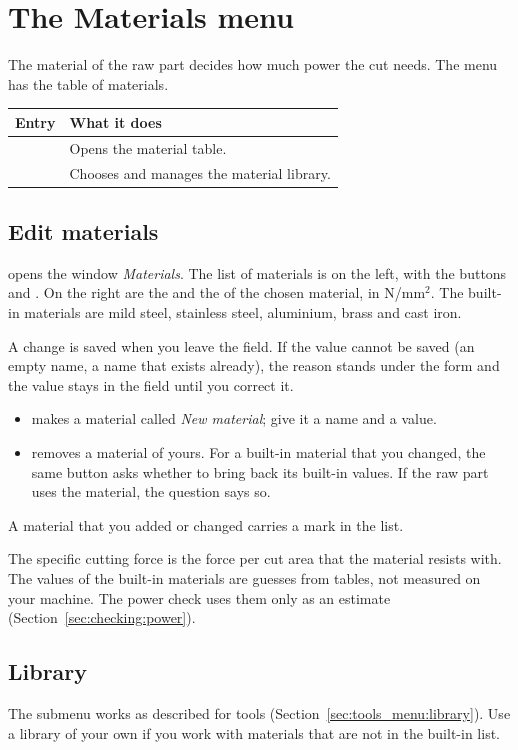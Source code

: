 \chapter{The Materials menu}\label{ch:materials_menu}

The material of the raw part decides how much power the cut needs. The  menu has the table of materials.

\begin{center}
\begin{tabularx}{\textwidth}{@{}l Y@{}}
\toprule
\textbf{Entry} & \textbf{What it does} \\
\midrule
{} & Opens the material table. \\
 & Chooses and manages the material library. \\
\bottomrule
\end{tabularx}
\end{center}

\section{Edit materials}
 opens the window \emph{Materials}. The list of materials is on the left, with the buttons  and . On the right are the  and the  of the chosen material, in N/mm$^2$. The built-in materials are mild steel, stainless steel, aluminium, brass and cast iron.

A change is saved when you leave the field. If the value cannot be saved (an empty name, a name that exists already), the reason stands under the form and the value stays in the field until you correct it.

\begin{itemize}
  \item {} makes a material called \emph{New material}; give it a name and a value.
  \item {} removes a material of yours. For a built-in material that you changed, the same button asks whether to bring back its built-in values. If the raw part uses the material, the question says so.
\end{itemize}
A material that you added or changed carries a mark in the list.

\begin{notebox}
The specific cutting force is the force per cut area that the material resists with. The values of the built-in materials are guesses from tables, not measured on your machine. The power check uses them only as an estimate (Section~\ref{sec:checking:power}).
\end{notebox}

\section{Library}
The  submenu works as described for tools (Section~\ref{sec:tools_menu:library}). Use a library of your own if you work with materials that are not in the built-in list.
